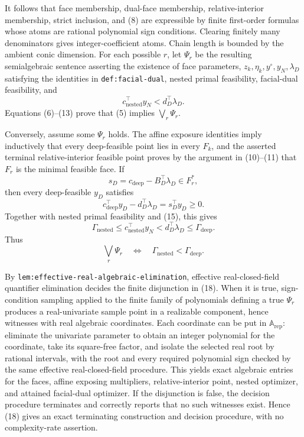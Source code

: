 It follows that face membership, dual-face membership, relative-interior membership, strict inclusion, and (8) are expressible by finite first-order formulas whose atoms are rational polynomial sign conditions.  Clearing finitely many denominators gives integer-coefficient atoms.  Chain length is bounded by the ambient conic dimension.  For each possible \(r\), let \(\Psi_r\) be the resulting semialgebraic sentence asserting the existence of face parameters, \(z_k,\eta_k,y^\circ,y_N,\lambda_D\) satisfying the identities in \texttt{def:facial-dual}, nested primal feasibility, facial-dual feasibility, and
\[
 c_{\mathrm{nested}}^{\top}y_N
 <d_D^{\top}\lambda_D.                                                  \tag{15}
\]
Equations (6)--(13) prove that (5) implies \(\bigvee_r\Psi_r\).

Conversely, assume some \(\Psi_r\) holds.  The affine exposure identities imply inductively that every deep-feasible point lies in every \(F_k\), and the asserted terminal relative-interior feasible point proves by the argument in (10)--(11) that \(F_r\) is the minimal feasible face.  If
\[
 s_D=c_{\mathrm{deep}}-B_D^{\top}\lambda_D\in F_r^*,
\]
then every deep-feasible \(y_D\) satisfies
\[
 c_{\mathrm{deep}}^{\top}y_D-d_D^{\top}\lambda_D
 =s_D^{\top}y_D\geq0.                                                   \tag{16}
\]
Together with nested primal feasibility and (15), this gives
\[
 \Gamma_{\mathrm{nested}}
 \leq c_{\mathrm{nested}}^{\top}y_N
 <d_D^{\top}\lambda_D
 \leq\Gamma_{\mathrm{deep}}.                                           \tag{17}
\]
Thus
\[
 \bigvee_r\Psi_r
 \quad\Longleftrightarrow\quad
 \Gamma_{\mathrm{nested}}<\Gamma_{\mathrm{deep}}.                     \tag{18}
\]

By \texttt{lem:effective-real-algebraic-elimination}, effective real-closed-field quantifier elimination decides the finite disjunction in (18).  When it is true, sign-condition sampling applied to the finite family of polynomials defining a true \(\Psi_r\) produces a real-univariate sample point in a realizable component, hence witnesses with real algebraic coordinates.  Each coordinate can be put in \(\mathbb A_{\mathrm{rep}}\): eliminate the univariate parameter to obtain an integer polynomial for the coordinate, take its square-free factor, and isolate the selected real root by rational intervals, with the root and every required polynomial sign checked by the same effective real-closed-field procedure.  This yields exact algebraic entries for the faces, affine exposing multipliers, relative-interior point, nested optimizer, and attained facial-dual optimizer.  If the disjunction is false, the decision procedure terminates and correctly reports that no such witnesses exist.  Hence (18) gives an exact terminating construction and decision procedure, with no complexity-rate assertion.

